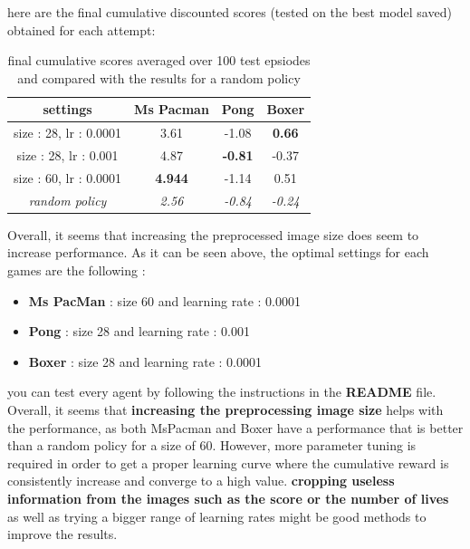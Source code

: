 \documentclass{report}
\begin{document}
here are the final cumulative discounted scores (tested on the best model saved) obtained for each attempt: \\

\begin{table}[H]
\centering
\label{b4Tab}
\begin{tabular}{|c|c|c|c|}
\hline
settings 				& Ms Pacman 		& Pong 				& Boxer 		  \\ \hline
size : 28, lr : 0.0001  & 3.61 				& -1.08 			& \textbf{0.66}   \\ \hline
size : 28, lr : 0.001  	& 4.87 				& \textbf{-0.81} 	& -0.37 		  \\ \hline
size : 60, lr : 0.0001  & \textbf{4.944} 	& -1.14 			& 0.51	 		  \\ \hline
\textit{random policy} 	& \textit{2.56} 	& \textit{-0.84}	& \textit{-0.24}  \\ \hline
\end{tabular}


\caption{final cumulative scores averaged over 100 test epsiodes and compared with the results for a random policy }
\end{table}

Overall, it seems that increasing the preprocessed image size does seem to increase performance. As it can be seen above, the optimal settings  for each games are the following : 

\begin{itemize}
	\item \textbf{Ms PacMan} : size 60 and learning rate : 0.0001
	\item \textbf{Pong} : size 28 and learning rate : 0.001
	\item \textbf{Boxer} : size 28 and learning rate : 0.0001
\end{itemize}

you can test every agent by following the instructions in the \textbf{README} file. \\

Overall, it seems that \textbf{increasing the preprocessing image size} helps with the performance, as both MsPacman and Boxer have a performance that is better than a random policy for a size of 60. However, more parameter tuning is required in order to get a proper learning curve where the cumulative reward is consistently increase and converge to a high value. \textbf{cropping useless information from the images such as the score or the number of lives} as well as trying a bigger range of learning rates might be good methods to improve the results.
\end{document}
